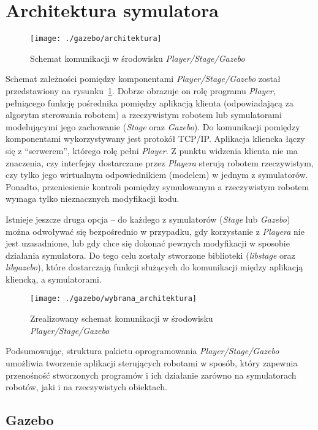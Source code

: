 	\section{Architektura symulatora}
	\begin{figure}[!b]
	\centering
	\texttt{[image: ./gazebo/architektura]}
	\caption{Schemat komunikacji w środowisku \textit{Player/Stage/Gazebo} \label{fig:arch}}
	\end{figure}
	
	Schemat zależności pomiędzy komponentami \textit{Player/Stage/Gazebo} został przedstawiony na 
	rysunku~\ref{fig:arch}.
	Dobrze obrazuje on rolę programu \textit{Player}, pełniącego funkcję pośrednika pomiędzy aplikacją klienta 
	(odpowiadającą za algorytm sterowania robotem) a rzeczywistym robotem lub symulatorami modelującymi jego zachowanie (\textit{Stage} oraz \textit{Gazebo}). Do komunikacji 
	pomiędzy komponentami wykorzystywany jest protokół TCP/IP. Aplikacja kliencka łączy się z ``serwerem'', którego
	rolę pełni \textit{Player}. Z punktu widzenia klienta nie ma znaczenia, czy interfejsy dostarczane przez \textit{Playera} sterują robotem rzeczywistym,
	czy tylko jego wirtualnym odpowiednikiem (modelem) w jednym z symulatorów. Ponadto, przeniesienie kontroli
	pomiędzy symulowanym a rzeczywistym robotem wymaga tylko nieznacznych modyfikacji kodu.

	Istnieje jeszcze druga opcja -- do każdego z symulatorów (\textit{Stage} lub \textit{Gazebo}) można odwoływać się bezpośrednio w przypadku,
	gdy korzystanie z \textit{Playera} nie jest uzasadnione, lub gdy chce się dokonać pewnych modyfikacji w sposobie
	działania symulatora. Do tego celu zostały stworzone biblioteki (\textit{libstage} oraz \textit{libgazebo}), 
	które dostarczają funkcji służących do komunikacji między aplikacją kliencką, a symulatorami.
	\begin{figure}[h]
	\centering
	\texttt{[image: ./gazebo/wybrana\_architektura]}
	\caption{Zrealizowany schemat komunikacji w środowisku \textit{Player/Stage/Gazebo} \label{fig:wybrana_arch}}
	\end{figure}
	Podsumowując, struktura pakietu oprogramowania \mbox{\textit{Player/Stage/Gazebo}} umożliwia tworzenie aplikacji sterujących robotami w sposób, który zapewnia przenośność stworzonych programów i ich działanie zarówno na symulatorach robotów, jaki i na rzeczywistych obiektach.
	
 	\subsection{Gazebo}
 	

